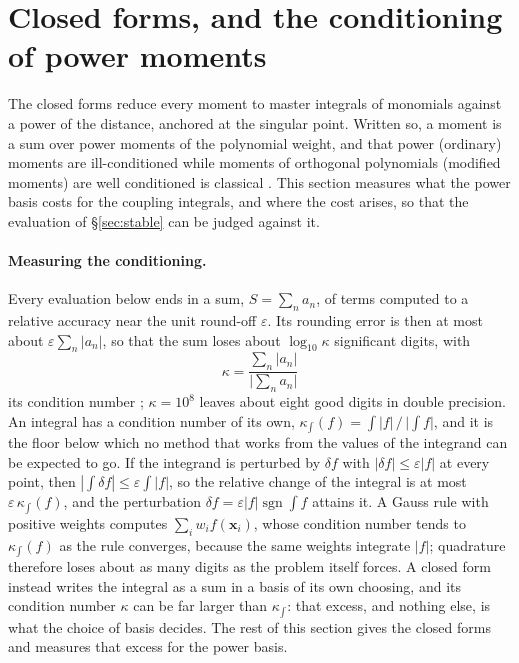 \documentclass[11pt,a4paper]{article}
\begin{document}
\section{Closed forms, and the conditioning of power moments}\label{sec:conditioning}

The closed forms reduce every moment to master integrals of monomials against a power of the distance,
anchored at the singular point. Written so, a moment is a sum over power moments of the polynomial weight,
and that power (ordinary) moments are ill-conditioned while moments of orthogonal polynomials (modified
moments) are well conditioned is classical \citep{Gautschi1970}. This section measures what the power basis
costs for the coupling integrals, and where the cost arises, so that the evaluation of \S\ref{sec:stable}
can be judged against it.

\paragraph{Measuring the conditioning.} Every evaluation below ends in a sum, $S=\sum_na_n$, of terms computed to
a relative accuracy near the unit round-off $\varepsilon$. Its rounding error is then at most about
$\varepsilon\sum_n|a_n|$, so that the sum loses about $\log_{10}\kappa$ significant digits, with
\begin{equation}\label{eq:kappa}
  \kappa=\frac{\sum_n|a_n|}{\bigl|\sum_na_n\bigr|}
\end{equation}
its condition number \citep{Higham2002}; $\kappa=10^{8}$ leaves about eight good digits in double
precision. An integral has a condition number of its own,
$\kappa_{\mathord{\int}}(f)=\int|f|\,\big/\,\bigl|\int f\bigr|$, and it is the floor below which no method that works from
the values of the integrand can be expected to go. If the integrand is perturbed by $\delta f$ with
$|\delta f|\le\varepsilon|f|$ at every point, then $|\int\delta f|\le\varepsilon\int|f|$, so the relative
change of the integral is at most $\varepsilon\,\kappa_{\mathord{\int}}(f)$, and the perturbation
$\delta f=\varepsilon|f|\operatorname{sgn}\int f$ attains it. A Gauss rule with positive weights computes
$\sum_iw_if(\mathbf x_i)$, whose condition number tends to $\kappa_{\mathord{\int}}(f)$ as the rule converges, because
the same weights integrate $|f|$; quadrature therefore loses about as many digits as the problem itself
forces. A closed form instead writes the integral as a sum in a basis of its own choosing, and its condition
number $\kappa$ can be far larger than $\kappa_{\mathord{\int}}$: that excess, and nothing else, is what the
choice of basis decides. The rest of this section gives the closed forms and measures that excess for the power basis.
\end{document}
